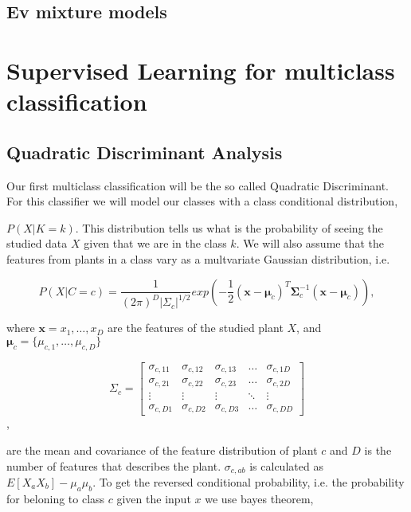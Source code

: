\subsection{Ev mixture models}


\section{Supervised Learning for multiclass classification}

\subsection{Quadratic Discriminant Analysis}

Our first multiclass classification will be the so called Quadratic Discriminant. For this classifier we will model our classes with a class conditional distribution,

$P(X|K=k)$. This distribution tells us what is the probability of seeing the studied data $X$ given that we are in the class $k$. We will also assume that the features from plants in a class vary as a multvariate Gaussian distribution, i.e.


\begin{equation}
P(X|C=c)=\frac{1}{(2\pi)^D|\Sigma_c|^{1/2}}exp\left(-\frac{1}{2}(\bm{x}-\bm{\mu}_c)^{T}\bm{\Sigma}^{-1}_c(\bm{x}-\bm{\mu}_c)\right),
\end{equation}

where $\bm{x}={x_1,\dots,x_{D}}$ are the features of the studied plant $X$,  and
$\bm{\mu}_c=\{\mu_{c,1},\dots,\mu_{c,D}\}$

\[
\Sigma_{c}=
\begin{bmatrix}
    \sigma_{c,11} & \sigma_{c,12} & \sigma_{c,13} & \dots  & \sigma_{c,1D} \\
    \sigma_{c,21} & \sigma_{c,22} & \sigma_{c,23} & \dots  & \sigma_{c,2D} \\
    \vdots & \vdots & \vdots & \ddots & \vdots \\
    \sigma_{c,D1} & \sigma_{c,D2} & \sigma_{c,D3} & \dots  & \sigma_{c,DD}
\end{bmatrix}\],

are the mean and covariance of the feature distribution of plant $c$ and $D$ is the number of features that describes the plant. $\sigma_{c,ab}$ is calculated as $E[X_aX_b]-\mu_a\mu_b$. To get the reversed conditional probability, i.e. the probability for beloning to class $c$ given the input $x$ we use bayes theorem,

